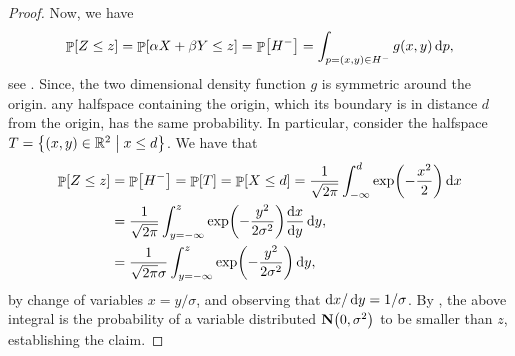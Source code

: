 \begin{proof}
Now, we have
    \begin{equation*}
        \Prob{Z \leq z}%
        =%
        \Prob{\alpha X + \beta Y \leq z}
        =%
        \Prob{H^-}%
        =%
        \int_{p=(x,y)\in H^-} g(x,y) \diffX{p},
    \end{equation*}
    see .  Since, the two dimensional density
    function $g$ is symmetric around the origin. any halfspace
    containing the origin, which its boundary is in distance $d$ from
    the origin, has the same probability. In particular, consider the
    halfspace $T=\left\{  (x,y)\in\mathbb{R}^2 \;\middle\vert\;  x \leq d \right\}$. We have that
    \begin{align*}
      \Prob{Z \leq z}%
      &=%
        \Prob{H^-}%
        =%
        \Prob{T}%
        =%
        \Prob{X \leq d} %
        =%
        \frac{1}{\sqrt{2\pi}}\int_{-\infty}^d \exp\pth{-\frac{x^2}{2}} \diffX{x}
      \\&%
      =%
      \frac{1}{\sqrt{2\pi } }\int_{y=-\infty}^z
      \exp\pth{-\frac{y^2}{2\sigma^2}} \frac{\diffX{x}}{ \diffX{y}} \diffX{y},
      \\&%
      =%
      \frac{1}{\sqrt{2\pi } \sigma}\int_{y=-\infty}^z
      \exp\pth{-\frac{y^2}{2\sigma^2}}  \diffX{y},
    \end{align*}
    by change of variables $x = y/\sigma$, and observing that
    $\mathop{}\!\mathrm{d}x / \mathop{}\!\mathrm{d}y = 1/\sigma$. By ,
    the above integral is the probability of a variable distributed
    $\NormalY{0}{\sigma^2}$ to be smaller than $z$, establishing the
    claim.
\end{proof}

